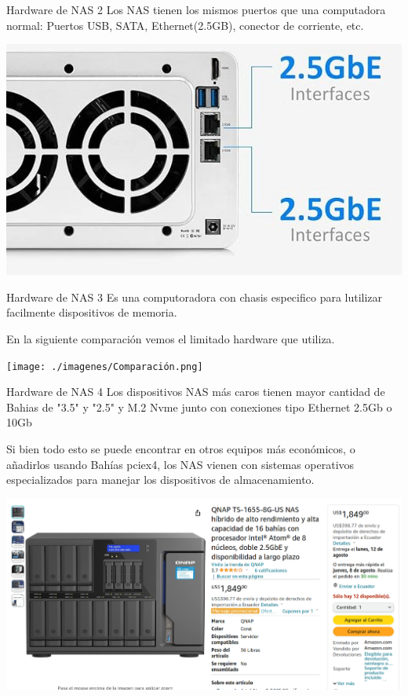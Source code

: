 \documentclass[presentation]{beamer}
\begin{document}
\begin{frame}[label={sec:orgfdf5f77}]{Hardware de NAS 2}
Los NAS tienen los mismos puertos que una computadora normal: Puertos USB, SATA, Ethernet(2.5GB), conector de corriente, etc.

\begin{center}
\includegraphics[width=.9\linewidth]{./imagenes/Componentes4.jpg}
\end{center}
\end{frame}

\begin{frame}[label={sec:org5443b39}]{Hardware de NAS 3}
Es una computoradora con chasis especifico para lutilizar facilmente dispositivos de memoria.

En la siguiente comparación vemos el limitado hardware que utiliza.

\begin{center}
\texttt{[image: ./imagenes/Comparación.png]}
\end{center}
\end{frame}

\begin{frame}[label={sec:org819488c}]{Hardware de NAS 4}
Los dispositivos NAS más caros tienen mayor cantidad de Bahias de "3.5" y "2.5" y M.2 Nvme junto con conexiones tipo Ethernet 2.5Gb o 10Gb

Si bien todo esto se puede encontrar en otros equipos más económicos, o añadirlos usando Bahías pciex4, los NAS vienen con sistemas operativos especializados para manejar los dispositivos de almacenamiento.

\begin{center}
\includegraphics[width=.9\linewidth]{./imagenes/NAS Premium.png}
\end{center}
\end{frame}
\end{document}
